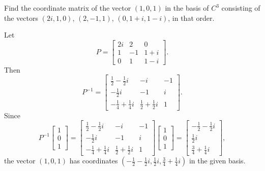  Find the coordinate matrix of the vector $(1, 0, 1)$ in the
basis of $C^3$ consisting of the vectors $(2i, 1, 0)$, $(2, -1, 1)$,
$(0, 1 + i, 1 - i)$, in that order.
\begin{solution}
  Let
  \begin{equation*}
    P =
    \begin{bmatrix}
      2i & 2 & 0 \\
      1 & -1 & 1 + i \\
      0 & 1 & 1 - i
    \end{bmatrix}.
  \end{equation*}
  Then
  \begin{equation*}
    P^{-1} =
    \begin{bmatrix}
      \frac12 - \frac12i & -i & -1 \\[3pt]
      -\frac12i & -1 & i \\[3pt]
      -\frac14 + \frac14i & \frac12 + \frac12i & 1
    \end{bmatrix}.
  \end{equation*}
  Since
  \begin{equation*}
    P^{-1}
    \begin{bmatrix}
      1 \\ 0 \\ 1
    \end{bmatrix}
    =
    \begin{bmatrix}
      \frac12 - \frac12i & -i & -1 \\[3pt]
      -\frac12i & -1 & i \\[3pt]
      -\frac14 + \frac14i & \frac12 + \frac12i & 1
    \end{bmatrix}
    \begin{bmatrix}
      1 \\ 0 \\ 1
    \end{bmatrix}
    =
    \begin{bmatrix}
      -\frac12 - \frac12i \\[3pt] \frac12i \\[3pt] \frac34 + \frac14i
    \end{bmatrix},
  \end{equation*}
  the vector $(1,0,1)$ has coordinates
  $\left(-\frac12 - \frac12i, \frac12i, \frac34 + \frac14i\right)$ in
  the given basis.
\end{solution}

